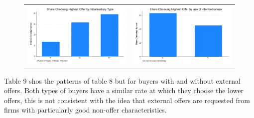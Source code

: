 \documentclass[12pt]{article}
\begin{document}
 
\begin{figure}[H]
\caption{}
 \label{fig:ie4_11}
\centering{}%
\begin{tabular}{cc}
\includegraphics[scale=0.17]{../figures/IE4/IE4_highest_by_intermediary_type.png} 
& \includegraphics[scale=0.17]{../figures/IE4/IE4_highest_by_intermediary_type(2).png} 
\end{tabular}
\end{figure} 
 
Table 9 shos the patterns of table 8 but for buyers with and without external offers. Both types of buyers have a similar rate at which they choose the lower offers, this is not consistent with the idea that external offers are requested from firms with particularly good non-offer characteristics. 


\end{document}
